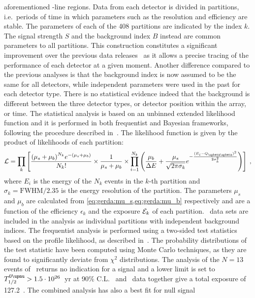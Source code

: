 aforementioned \g-line regions.
\newpar
Data from each detector is divided in partitions, i.e.~periods of time in which parameters
such as the resolution and efficiency are stable. The parameters of each of the 408
partitions are indicated by the index $k$. The signal strength $S$ and the background
index $B$ instead are common parameters to all partitions. This construction constitutes a
significant improvement over the previous data releases~\cite{Agostini2019a, Agostini2018,
Agostini2017} as it allows a precise tracing of the performance of each detector at a
given moment. Another difference compared to the previous analyses is that the background
index is now assumed to be the same for all detectors, while independent parameters were
used in the past for each detector type. There is no statistical evidence indeed that the
background is different between the three detector types, or detector position within the
array, or time.
\newpar
The statistical analysis is based on an unbinned extended likelihood function and it is
performed in both frequentist and Bayesian frameworks, following the procedure described
in~\cite{Agostini2017}. The likelihood function is given by the product of likelihoods of
each partition:
\[
  \mathcal{L} = \prod_k \left[
    \frac{{(\mu_s + \mu_b)}^{N_k} e^{-(\mu_s + \mu_b)}}{N_k!} \times
    \frac{1}{\mu_s + \mu_b} \times
    \prod^{N_k}_{i=1} \left(
      \frac{\mu_b}{\Delta{}E} +
      \frac{\mu_s}{\sqrt{2\pi\sigma_k}} e^{-\frac{{(E_i - \qbbM)}^2}{2\sigma_k^2}}
    \right)
  \right] \;,
\]
where $E_i$ is the energy of the $N_k$ events in the $k$-th partition and $\sigma_k =
\text{FWHM}/2.35$ is the energy resolution of the partition. The parameters $\mu_s$ and
$\mu_b$ are calculated from \cref{eq:gerda:mu_s,eq:gerda:mu_b} respectively and are a
function of the efficiency $\epsilon_k$ and the exposure $\mathcal{E}_k$ of each partition.
\phaseone\ data sets are included in the analysis as individual partitions with
independent background indices.
\newpar
The frequentist analysis is performed using a two-sided test statistics based on the
profile likelihood, as described in~\cite{Agostini2017}. The probability distributions of
the test statistic have been computed using Monte Carlo techniques, as they are found to
significantly deviate from $\chi^2$ distributions. The analysis of the $N=13$ events of
\phasetwo\ returns no indication for a signal and a lower limit is set to $\thalfzeroM >
1.5 \cdot 10^{26}$~yr at 90\% C.L. \phaseone\ and \phasetwo\ data together give a total
exposure of 127.2~\kgyr. The combined analysis has also a best fit for null signal
